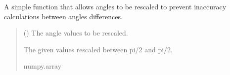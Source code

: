 \documentclass[letterpaper,10pt,english]{sphinxmanual}
\begin{document}
\begin{fulllineitems}
\label{\detokenize{modules/waypoints/generation:qnav.waypoints.generation.rescale_values}}
\pysigstartsignatures
{}
\pysigstopsignatures
\sphinxAtStartPar
A simple function that allows angles to be re\sphinxhyphen{}scaled to prevent inaccuracy
calculations between angles differences.
\begin{quote}\begin{description}
\sphinxAtStartPar
{} () \textendash{} The angle values to be rescaled.

\sphinxAtStartPar
The given values re\sphinxhyphen{}scaled between \sphinxhyphen{}pi/2 and pi/2.

\sphinxAtStartPar
numpy.array

\end{description}\end{quote}

\end{fulllineitems}

\end{document}
